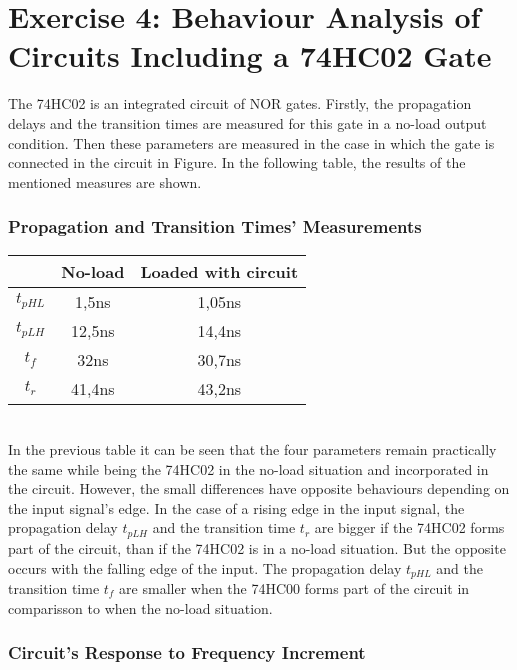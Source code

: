 \documentclass[a4paper,11pt]{report}
\begin{document}
\section{\color{olive}Exercise 4: Behaviour Analysis of Circuits Including a 74HC02 Gate}

The 74HC02 is an integrated circuit of NOR gates. Firstly, the propagation delays and the transition times are measured for this gate in a no-load output condition. Then these parameters are measured in the case in which the gate is connected in the circuit in Figure. %
In the following table, the results of the mentioned measures are shown.

\subsubsection{\color{red}Propagation and Transition Times' Measurements}

\begin{tabular}{|c|c|c|}
\hline
 &No-load & Loaded with circuit \\ %
\hline
\hline
$t_{pHL}$ & 1,5ns & 1,05ns \\
\hline
$t_{pLH}$ & 12,5ns & 14,4ns\\
\hline
$t_{f}$ & 32ns & 30,7ns\\
\hline
$t_{r}$ & 41,4ns & 43,2ns \\
\hline
\end{tabular}\\



In the previous table it can be seen that the four parameters remain practically the same while being the 74HC02 in the no-load situation and incorporated in the circuit. However, the small differences have opposite behaviours depending on the input signal's edge. In the case of a rising edge in the input signal, the propagation delay $t_{pLH}$ and the transition time $t_{r}$ are bigger if the 74HC02 forms part of the circuit, than if the 74HC02 is in a no-load situation. But the opposite occurs with the falling edge of the input. The propagation delay $t_{pHL}$ and the transition time $t_{f}$ are smaller when the 74HC00 forms part of the circuit in comparisson to when the no-load situation.

\subsubsection{\color{red}Circuit's Response to Frequency Increment}
\end{document}
